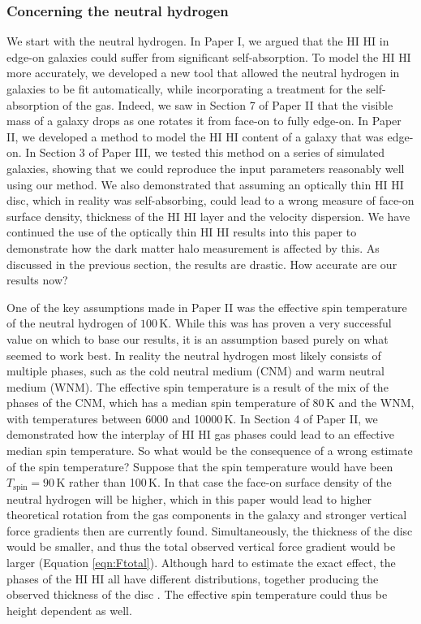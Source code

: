 \documentclass[useAMS,usenatbib]{mn2e}
\newcommand{\hi}{%
  \relax
  \ifmmode
    \textrm{\textsc{HI}}
  \else
    \textsc{H{\smaller}I}
  \fi
}
\begin{document}
\subsubsection{Concerning the neutral hydrogen}

We start  with the neutral hydrogen.
In Paper I, we argued that the \hi in edge-on galaxies 
could suffer from significant self-absorption. 
To model the \hi more accurately, we developed a new tool that allowed 
the neutral hydrogen in galaxies to  be fit automatically, while 
incorporating a treatment for the self-absorption of the gas.
Indeed, we saw in Section 7 of Paper II that the 
visible mass of a galaxy drops as one rotates it from face-on to 
fully edge-on. 
In Paper II, we developed a method 
to model the \hi content of a galaxy that was edge-on. 
In Section 3 of Paper III, we tested this method on 
a series of simulated galaxies, showing that we could reproduce the 
input parameters reasonably well using our method. 
We also demonstrated that assuming an optically thin \hi disc, which 
in reality was self-absorbing, could lead to a wrong measure of face-on 
surface density, thickness of the \hi layer and the velocity dispersion.
We have continued the use of the optically thin \hi results into this 
paper to demonstrate how the dark matter halo measurement is affected by this.
As discussed in the previous section, the results are  drastic.
How accurate are our results now?

One of the key assumptions made in Paper II 
was the effective spin temperature of the neutral hydrogen of $100$\,K. 
While this was has proven a very successful value on which to base our 
results, it is an assumption based purely on what seemed to work best.
In reality the neutral hydrogen most likely consists of multiple phases, such 
as the cold neutral medium (CNM) and warm neutral medium (WNM). 
The effective spin temperature is a result of the mix of the phases of the 
CNM, which has a median spin temperature of 80\,K and the WNM, with 
temperatures between 6000 and 10000\,K.
In Section 4 of Paper II, we demonstrated how the interplay 
of \hi gas phases could lead to an effective median spin temperature.
So what would be the consequence of a wrong estimate of the spin temperature? 
Suppose that the spin temperature would have been $T_\textrm{spin}=90$\,K 
rather than 100\,K. 
In that case the face-on surface density of the neutral hydrogen will 
be higher, which in this paper would lead to higher theoretical 
rotation from the gas components in the galaxy and stronger vertical 
force gradients then are currently found.
Simultaneously, the thickness of the disc would be smaller, and thus 
the total observed vertical force gradient would be larger (Equation 
\ref{eqn:Ftotal}).
Although hard to estimate the exact effect, the phases of the \hi all 
have different distributions, together producing the observed thickness 
of the disc \citep{Lockman1991}. 
The effective spin temperature could thus be height dependent as well.
\end{document}
